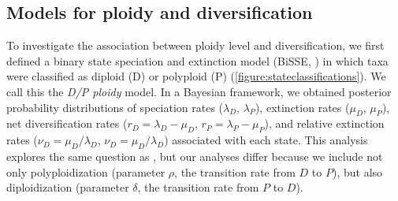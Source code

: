 

\subsection{Models for ploidy and diversification}

To investigate the association between ploidy level and diversification, we first defined a binary state speciation and extinction model (BiSSE, \citealt{maddison_2007}) in which taxa were classified as diploid (D) or polyploid (P) (\cref{figure:stateclassifications}).
We call this the \textit{D/P ploidy} model. %
In a Bayesian framework, we obtained posterior probability distributions of speciation rates ($\lambda_D$, $\lambda_P$), extinction rates ($\mu_D$, $\mu_P$), net diversification rates ($r_D=\lambda_D-\mu_D$, $r_P=\lambda_P-\mu_P$), and relative extinction rates ($\nu_D=\mu_D / \lambda_D$, $\nu_D=\mu_D / \lambda_D$) associated with each state.
This analysis explores the same question as \citet{mayrose_2011, mayrose_2015}, but our analyses differ because we include not only polyploidization (parameter $\rho$, the transition rate from $D$ to $P$), but also diploidization (parameter $\delta$, the transition rate from $P$ to $D$). %


